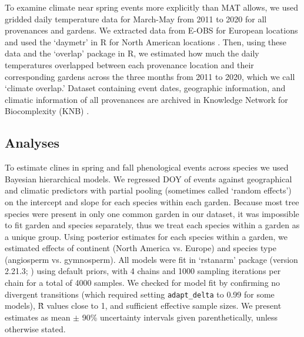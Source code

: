 \documentclass[12pt]{article}
\begin{document}
To examine climate near spring events more explicitly than MAT allows, we used gridded daily temperature data for March-May from 2011 to 2020 for all provenances and gardens. We extracted data from E-OBS for European locations and used the `daymetr' in R for North American locations \citep{cornes2018,hufkens2018}. Then, using these data and the `overlap' package in R, we estimated how much the daily temperatures overlapped between each provenance location and their corresponding gardens across the three months from 2011 to 2020, which we call `climate overlap.' Dataset containing event dates, geographic information, and climatic information of all provenances are archived in  Knowledge Network for Biocomplexity (KNB) \citep{zeng23}.  %

\subsection{Analyses}
To estimate clines in spring and fall phenological events across species we used Bayesian hierarchical models. We regressed DOY of events against geographical and climatic predictors with partial pooling (sometimes called `random effects') on the intercept and slope for each species within each garden. Because most tree species were present in only one common garden in our dataset, it was impossible to fit garden and species separately, thus we treat each species within a garden as a unique group. Using posterior estimates for each species within a garden, we estimated effects of continent (North America vs. Europe) and species type (angiosperm vs. gymnosperm). All models were fit in `rstanarm' package (version 2.21.3; \citealp{brilleman2018}) using default priors, with 4 chains and 1000 sampling iterations per chain for a total of 4000 samples. We checked for model fit by confirming no divergent transitions (which required setting \texttt{adapt\_delta} to 0.99 for some models), \^{R} values close to 1, and sufficient effective sample sizes. We present estimates as mean $\pm$ 90\% uncertainty intervals given parenthetically, unless otherwise stated. 
\end{document}
